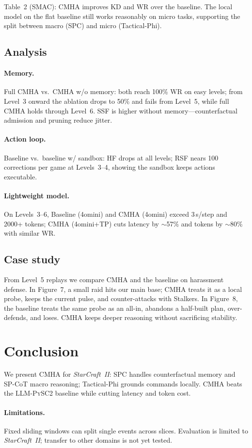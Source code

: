 \documentclass[11pt,a4paper]{article}
\begin{document}
Table~2 (SMAC): CMHA improves KD and WR over the baseline. The local model on the flat baseline still works reasonably on micro tasks, supporting the split between macro (SPC) and micro (Tactical-Phi).

\subsection{Analysis}

\paragraph{Memory.}
Full CMHA vs.\ CMHA w/o memory: both reach 100\% WR on easy levels; from Level~3 onward the ablation drops to 50\% and fails from Level~5, while full CMHA holds through Level~6. SSF is higher without memory—counterfactual admission and pruning reduce jitter.

\paragraph{Action loop.}
Baseline vs.\ baseline w/ sandbox: HF drops at all levels; RSF nears 100 corrections per game at Levels~3--4, showing the sandbox keeps actions executable.

\paragraph{Lightweight model.}
On Levels~3--6, Baseline (4omini) and CMHA (4omini) exceed 3\,s/step and 2000+ tokens; CMHA (4omini+TP) cuts latency by ${\sim}$57\% and tokens by ${\sim}$80\% with similar WR.

\subsection{Case study}

From Level~5 replays we compare CMHA and the baseline on harassment defense. In Figure~7, a small raid hits our main base; CMHA treats it as a local probe, keeps the current pulse, and counter-attacks with Stalkers. In Figure~8, the baseline treats the same probe as an all-in, abandons a half-built plan, over-defends, and loses. CMHA keeps deeper reasoning without sacrificing stability.

\section{Conclusion}

We present CMHA for \textit{StarCraft~II}: SPC handles counterfactual memory and SP-CoT macro reasoning; Tactical-Phi grounds commands locally. CMHA beats the \textsc{LLM-PySC2} baseline while cutting latency and token cost.

\paragraph{Limitations.}
Fixed sliding windows can split single events across slices. Evaluation is limited to \textit{StarCraft~II}; transfer to other domains is not yet tested.



\end{document}
